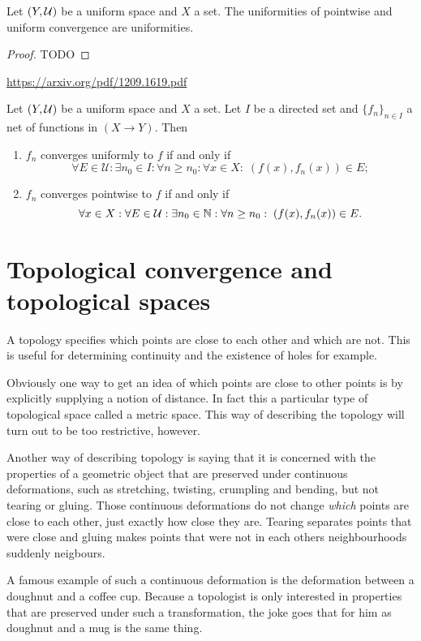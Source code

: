 \begin{lemma}
Let $\left( Y,\mathcal{U} \right)$ be a uniform space and $X$ a set. The uniformities of pointwise and uniform convergence are uniformities.
\end{lemma}
\begin{proof}
TODO
\end{proof}

\url{https://arxiv.org/pdf/1209.1619.pdf}

\begin{proposition}
Let $\left( Y,\mathcal{U} \right)$ be a uniform space and $X$ a set. Let $I$ be a directed set and $\{f_n\}_{n\in I}$ a net of functions in $(X\to Y)$. Then
\begin{enumerate}
\item $f_n$ converges uniformly to $f$ \textup{if and only if}
\[ \forall E\in\mathcal{U}: \exists n_0\in I: \forall n \geq n_0: \forall x\in X: \; (f(x), f_n(x)) \in E; \]
\item $f_n$ converges pointwise to $f$ \textup{if and only if}
\[ \forall x\in X: \forall E\in \mathcal{U}: \exists n_0\in \mathbb{N}: \forall n\geq n_0: \; (f(x), f_n(x)) \in E. \]
\end{enumerate}
\end{proposition}


\chapter{Topological convergence and topological spaces}
A topology specifies which points are close to each other and which are not. This is useful for determining continuity and the existence of holes for example.

Obviously one way to get an idea of which points are close to other points is by explicitly supplying a notion of distance. In fact this a particular type of topological space called a metric space. This way of describing the topology will turn out to be too restrictive, however.

Another way of describing topology is saying that it is concerned with the properties of a geometric object that are preserved under continuous deformations, such as stretching, twisting, crumpling and bending, but not tearing or gluing. Those continuous deformations do not change \textit{which} points are close to each other, just exactly how close they are. Tearing separates points that were close and gluing makes points that were not in each others neighbourhoods suddenly neigbours.

A famous example of such a continuous deformation is the deformation between a doughnut and a coffee cup. Because a topologist is only interested in properties that are preserved under such a transformation, the joke goes that for him as doughnut and a mug is the same thing.

